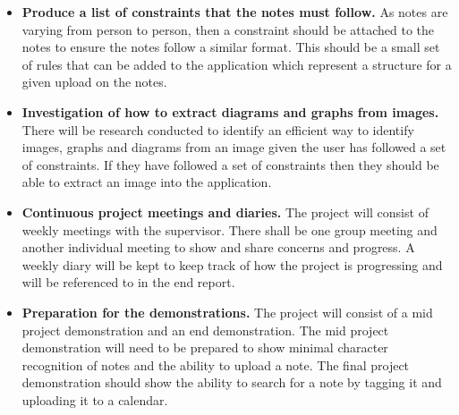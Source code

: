 \documentclass[11pt,fleqn,twoside]{article}
\begin{document}
\begin{itemize}
\begin{itemize}
  \end{itemize}

\item \textbf{Produce a list of constraints that the notes must follow.} As notes are varying from person to person, then a constraint should be attached to the notes to ensure the notes follow a similar format. This should be a small set of rules that can be added to the application which represent a structure for a given upload on the notes.

\item \textbf{Investigation of how to extract diagrams and graphs from images.} There will be research conducted to identify an efficient way to identify images, graphs and diagrams from an image given the user has followed a set of constraints. If they have followed a set of constraints then they should be able to extract an image into the application.

\item \textbf{Continuous project meetings and diaries.} The project will consist of weekly meetings with the supervisor. There shall be one group meeting and another individual meeting to show and share concerns and progress. A weekly diary will be kept to keep track of how the project is progressing and will be referenced to in the end report.

\item \textbf{Preparation for the demonstrations.} The project will consist of a mid project demonstration and an end demonstration. The mid project demonstration will need to be prepared to show minimal character recognition of notes and the ability to upload a note. The final project demonstration should show the ability to search for a note by tagging it and uploading it to a calendar.

\end{itemize}

\end{document}

